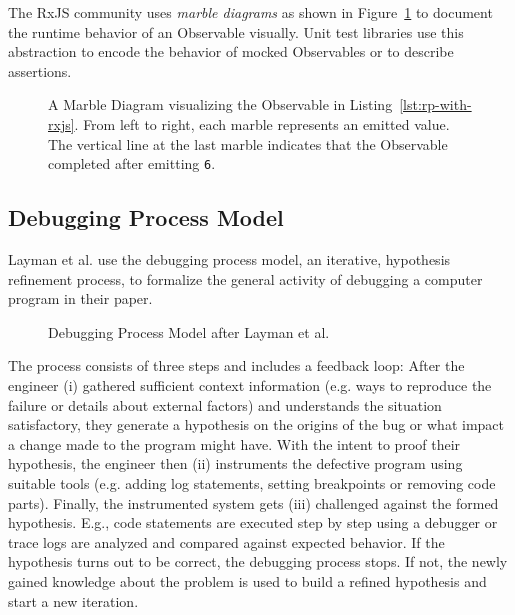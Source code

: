 \documentclass[sigplan,screen,review]{acmart}
\begin{document}
The RxJS community uses \emph{marble diagrams} as shown in Figure~\ref{fig:marble-diagram} to document \cite{marblediagrams} the runtime behavior of an Observable visually. Unit test libraries\cite{marbletesting} use this abstraction to encode the behavior of mocked Observables or to describe assertions.

\begin{figure}
	\centering
	\caption{A Marble Diagram visualizing the Observable in Listing~\ref{lst:rp-with-rxjs}. From left to right, each marble represents an emitted value. The vertical line at the last marble indicates that the Observable completed after emitting \texttt{6}.}
	\label{fig:marble-diagram}
\end{figure}

\subsection{Debugging Process Model}

Layman et al. \cite{Layman_Diep_Nagappan_Singer_Deline_Venolia_2013} use the debugging process model, an iterative, hypothesis refinement process, to formalize the general activity of debugging a computer program in their paper.

\begin{figure}
	\centering
	\caption{Debugging Process Model after Layman et al. \cite{Layman_Diep_Nagappan_Singer_Deline_Venolia_2013}}
	\label{fig:debugging-process-model}
\end{figure}

The process consists of three steps and includes a feedback loop: After the engineer (i) gathered sufficient context information (e.g. ways to reproduce the failure or details about external factors) and understands the situation satisfactory, they generate a hypothesis on the origins of the bug or what impact a change made to the program might have. With the intent to proof their hypothesis, the engineer then (ii) instruments the defective program using suitable tools (e.g. adding log statements, setting breakpoints or removing code parts). Finally, the instrumented system gets (iii) challenged against the formed hypothesis. E.g., code statements are executed step by step using a debugger or trace logs are analyzed and compared against expected behavior. If the hypothesis turns out to be correct, the debugging process stops. If not, the newly gained knowledge about the problem is used to build a refined hypothesis and start a new iteration.
\end{document}
